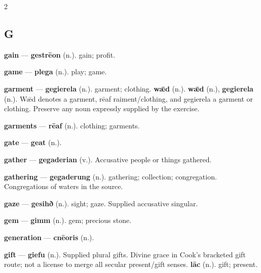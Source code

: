 \begin{multicols}{2}
\subsection*{G}
\textbf{gain} — \textbf{gestrēon} (n.). gain; profit.\par
\textbf{game} — \textbf{plega} (n.). play; game.\par
\textbf{garment} — \textbf{gegierela} (n.). garment; clothing. \textbf{wǣd} (n.).  \textbf{wǣd} (n.), \textbf{gegierela} (n.). Wǣd denotes a garment, rēaf raiment/clothing, and gegierela a garment or clothing. Preserve any noun expressly supplied by the exercise.\par
\textbf{garments} — \textbf{rēaf} (n.). clothing; garments.\par
\textbf{gate} — \textbf{geat} (n.).\par
\textbf{gather} — \textbf{gegaderian} (v.). Accusative people or things gathered.\par
\textbf{gathering} — \textbf{gegaderung} (n.). gathering; collection; congregation. Congregations of waters in the source.\par
\textbf{gaze} — \textbf{gesihð} (n.). sight; gaze. Supplied accusative singular.\par
\textbf{gem} — \textbf{gimm} (n.). gem; precious stone.\par
\textbf{generation} — \textbf{cnēoris} (n.).\par
\textbf{gift} — \textbf{giefu} (n.). Supplied plural gifts. Divine grace in Cook's bracketed gift route; not a license to merge all secular present/gift senses. \textbf{lāc} (n.). gift; present.\par

\end{multicols}
